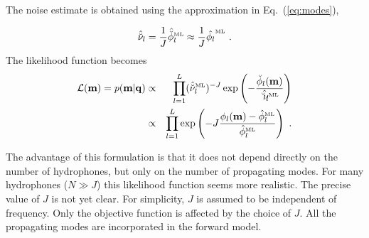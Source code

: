 \documentclass{saclantc}
\newcommand{\modespace}[1]{\breve{{#1}}}
\newcommand{\ML}[1]{\hat{#1}^{\mbox{\tiny\rm ML}}}
\begin{document}
The noise estimate is obtained using the approximation in Eq.~(\ref{eq:modes}),

\begin{equation}
   \hat{\modespace{\nu}}_l = 
       \frac{1}{J}{\ML{\modespace{\phi}}_l} \approx \frac{1}{J}\ML{\phi_l}~.
\end{equation}
The likelihood function becomes
\begin{eqnarray}
 {\cal L}({\bf m}) = p({\bf m} |{\bf q}) 
 &\propto &
  \prod_{l=1}^{L} (\ML{\modespace{\nu}}_l)^{-J} \exp 
       \left( -\frac{\modespace{\phi}_l({\bf m})}
                    {\ML{\modespace{\nu}_l}}\right) \nonumber \\
&\propto & 
  \prod_{l=1}^{L}
       \exp \left( -J\frac{\phi_l({\bf m})-\ML{\phi}_l}
        {\ML{\phi}_l}\right)~.
\label{eq:mlmfp_mode}
\end{eqnarray}

The advantage of this formulation is that it does not depend directly
on the number of hydrophones, but only on the number of propagating modes. 
For many hydrophones ($N\gg J$) this likelihood function seems more realistic. 
The precise value of $J$ is not yet clear. For simplicity,
$J$ is assumed to be independent of frequency.
% 
Only the objective function is affected by the choice of $J$. All the
propagating modes are incorporated in the forward model.
\end{document}
